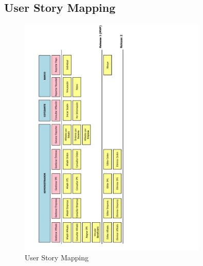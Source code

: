 \documentclass[12pt,a4paper]{article}
\begin{document}
\subsection{User Story Mapping}
\begin{figure}[H]
\centering
{\includegraphics[width=0.8\textwidth, angle=-90]{User_Story_Mapping.pdf} \par}
\caption{User Story Mapping}
\end{figure}
\newpage
\end{document}
